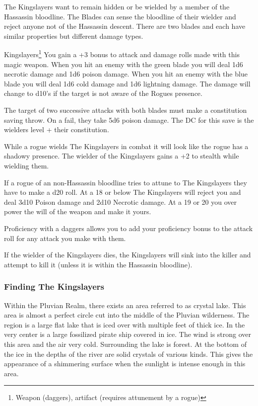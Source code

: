 The Kingslayers want to remain hidden or be wielded by a member of the Hassassin bloodline. The Blades can sense the bloodline of their wielder and reject anyone not of the Hassassin descent. There are two blades and each have similar properties but different damage types.

\begin{commentbox}{Kingslayers\footnote{Weapon (daggers), artifact (requires attunement by a rogue)}}
	You gain a +3 bonus to attack and damage rolls made with this magic weapon. When you hit an enemy with the green blade you will deal 1d6 necrotic damage and 1d6 poison damage. When you hit an enemy with the blue blade you will deal 1d6 cold damage and 1d6 lightning damage. The damage will change to d10's if the target is not aware of the Rogues presence.
	
	The target of two successive attacks with both blades must make a constitution saving throw. On a fail, they take 5d6 poison damage. The DC for this save is the wielders level + their constitution.
	
	While a rogue wields The Kingslayers in combat it will look like the rogue has a shadowy presence. The wielder of the Kingslayers gains a +2 to stealth while wielding them.
	
	If a rogue of an non-Hassassin bloodline tries to attune to The Kingslayers they have to make a d20 roll. At a 18 or below The Kingslayers will reject you and deal 3d10 Poison damage and 2d10 Necrotic damage. At a 19 or 20 you over power the will of the weapon and make it yours.
	
	Proficiency with a daggers allows you to add your proficiency bonus to the attack roll for any attack you make with them.
	
	If the wielder of the Kingslayers dies, the Kingslayers will sink into the killer and attempt to kill it (unless it is within the Hassassin bloodline).
\end{commentbox}

\subsubsection{Finding The Kingslayers}

Within the Pluvian Realm, there exists an area referred to as crystal lake. This area is almost a perfect circle cut into the middle of the Pluvian wilderness. The region is a large flat lake that is iced over with multiple feet of thick ice. In the very center is a large fossilized pirate ship covered in ice. The wind is strong over this area and the air very cold. Surrounding the lake is forest. At the bottom of the ice in the depths of the river are solid crystals of various kinds. This gives the appearance of a shimmering surface when the sunlight is intense enough in this area.

